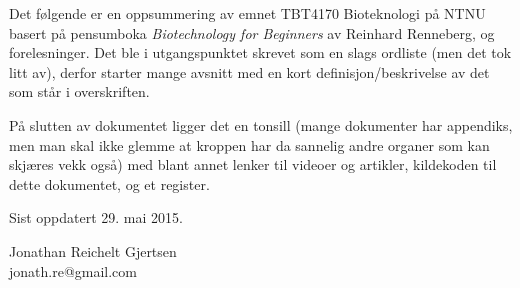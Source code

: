 \noindent Det følgende er en oppsummering av emnet TBT4170 Bioteknologi på NTNU basert på pensumboka \emph{Biotechnology for Beginners} av Reinhard Renneberg, og forelesninger. Det ble i utgangspunktet skrevet som en slags ordliste (men det tok litt av), derfor starter mange avsnitt med en kort definisjon/beskrivelse av det som står i overskriften.

På slutten av dokumentet ligger det en tonsill (mange dokumenter har appendiks, men man skal ikke glemme at kroppen har da sannelig andre organer som kan skjæres vekk også) med blant annet lenker til videoer og artikler, kildekoden til dette dokumentet, og et register.

Sist oppdatert 29. mai 2015.

\begin{flushright}Jonathan Reichelt Gjertsen \\ {\ttfamily jonath.re@gmail.com}\end{flushright}